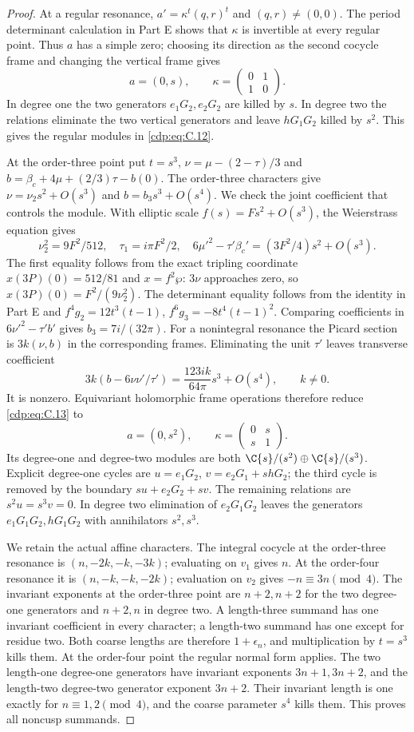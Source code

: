 \begin{proof}
At a regular resonance, $a'=\kappa^t(q,r)^t$ and $(q,r)\ne(0,0)$. The period determinant calculation in Part E shows that $\kappa$ is invertible at every regular point. Thus $a$ has a simple zero; choosing its direction as the second cocycle frame and changing the vertical frame gives
\[
 a=(0,s),\qquad\kappa=\begin{pmatrix}0&1\\1&0\end{pmatrix}.
\]
In degree one the two generators $e_1G_2,e_2G_2$ are killed by $s$. In degree two the relations eliminate the two vertical generators and leave $hG_1G_2$ killed by $s^2$. This gives the regular modules in \eqref{cdp:eq:C.12}.

At the order-three point put $t=s^3$, $\nu=\mu-(2-\tau)/3$ and $b=\beta_c+4\mu+(2/3)\tau-b(0)$. The order-three characters give $\nu=\nu_2s^2+O(s^3)$ and $b=b_3s^3+O(s^4)$. We check the joint coefficient that controls the module. With elliptic scale $f(s)=Fs^2+O(s^3)$, the Weierstrass equation gives
\[
 \nu_2^2=9F^2/512,\quad \tau_1=i\pi F^2/2,\quad
 6\mu'^2-\tau'\beta_c'=(3F^2/4)s^2+O(s^3).
\]
The first equality follows from the exact tripling coordinate $x(3P)(0)=512/81$ and $x=f^2\wp$: $3\nu$ approaches zero, so $x(3P)(0)=F^2/(9\nu_2^2)$. The determinant equality follows from the identity in Part E and $f^4g_2=12t^3(t-1)$, $f^6g_3=-8t^4(t-1)^2$. Comparing coefficients in $6\nu'^2-\tau'b'$ gives $b_3=7i/(32\pi)$. For a nonintegral resonance the Picard section is $3k(\nu,b)$ in the corresponding frames. Eliminating the unit $\tau'$ leaves transverse coefficient
\[
 3k(b-6\nu\nu'/\tau')
   =\frac{123ik}{64\pi}s^3+O(s^4),\qquad k\ne0.        \tag{C.14}\label{cdp:eq:C.14}
\]
It is nonzero. Equivariant holomorphic frame operations therefore reduce \eqref{cdp:eq:C.13} to
\[
 a=(0,s^2),\qquad\kappa=\begin{pmatrix}0&s\\s&1\end{pmatrix}.
\]
Its degree-one and degree-two modules are both $\C\{s\}/(s^2)\oplus\C\{s\}/(s^3)$. Explicit degree-one cycles are $u=e_1G_2$, $v=e_2G_1+shG_2$; the third cycle is removed by the boundary $su+e_2G_2+sv$. The remaining relations are $s^2u=s^3v=0$. In degree two elimination of $e_2G_1G_2$ leaves the generators $e_1G_1G_2,hG_1G_2$ with annihilators $s^2,s^3$.

We retain the actual affine characters. The integral cocycle at the order-three resonance is $(n,-2k,-k,-3k)$; evaluating on $v_1$ gives $n$. At the order-four resonance it is $(n,-k,-k,-2k)$; evaluation on $v_2$ gives $-n\equiv3n\pmod4$. The invariant exponents at the order-three point are $n+2,n+2$ for the two degree-one generators and $n+2,n$ in degree two. A length-three summand has one invariant coefficient in every character; a length-two summand has one except for residue two. Both coarse lengths are therefore $1+\epsilon_n$, and multiplication by $t=s^3$ kills them. At the order-four point the regular normal form applies. The two length-one degree-one generators have invariant exponents $3n+1,3n+2$, and the length-two degree-two generator exponent $3n+2$. Their invariant length is one exactly for $n\equiv1,2\pmod4$, and the coarse parameter $s^4$ kills them. This proves all noncusp summands.


\end{proof}
